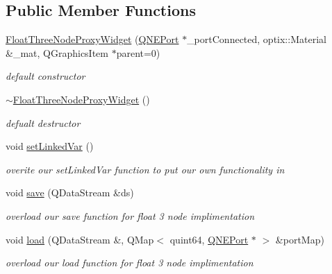 \subsection*{Public Member Functions}
\begin{DoxyCompactItemize}
\item 
\hyperlink{class_float_three_node_proxy_widget_ac212c5dca46905943b440d47aef9816e}{Float\-Three\-Node\-Proxy\-Widget} (\hyperlink{class_q_n_e_port}{Q\-N\-E\-Port} $\ast$\-\_\-port\-Connected, optix\-::\-Material \&\-\_\-mat, Q\-Graphics\-Item $\ast$parent=0)
\begin{DoxyCompactList}\small\item\em default constructor \end{DoxyCompactList}\item 
\hypertarget{class_float_three_node_proxy_widget_ad56cb8416bf4207dedd542cf5a359d63}{\hyperlink{class_float_three_node_proxy_widget_ad56cb8416bf4207dedd542cf5a359d63}{$\sim$\-Float\-Three\-Node\-Proxy\-Widget} ()}\label{class_float_three_node_proxy_widget_ad56cb8416bf4207dedd542cf5a359d63}

\begin{DoxyCompactList}\small\item\em defualt destructor \end{DoxyCompactList}\item 
\hypertarget{class_float_three_node_proxy_widget_a646dc00d5bf72c2555e0251b58a8b640}{void \hyperlink{class_float_three_node_proxy_widget_a646dc00d5bf72c2555e0251b58a8b640}{set\-Linked\-Var} ()}\label{class_float_three_node_proxy_widget_a646dc00d5bf72c2555e0251b58a8b640}

\begin{DoxyCompactList}\small\item\em overite our set\-Linked\-Var function to put our own functionality in \end{DoxyCompactList}\item 
\hypertarget{class_float_three_node_proxy_widget_afd953a0e2e5ac6f59b7b5c50ecbc7fa9}{void \hyperlink{class_float_three_node_proxy_widget_afd953a0e2e5ac6f59b7b5c50ecbc7fa9}{save} (Q\-Data\-Stream \&ds)}\label{class_float_three_node_proxy_widget_afd953a0e2e5ac6f59b7b5c50ecbc7fa9}

\begin{DoxyCompactList}\small\item\em overload our save function for float 3 node implimentation \end{DoxyCompactList}\item 
\hypertarget{class_float_three_node_proxy_widget_acbbe2ad712df333c00ee33f26b12fc61}{void \hyperlink{class_float_three_node_proxy_widget_acbbe2ad712df333c00ee33f26b12fc61}{load} (Q\-Data\-Stream \&, Q\-Map$<$ quint64, \hyperlink{class_q_n_e_port}{Q\-N\-E\-Port} $\ast$ $>$ \&port\-Map)}\label{class_float_three_node_proxy_widget_acbbe2ad712df333c00ee33f26b12fc61}

\begin{DoxyCompactList}\small\item\em overload our load function for float 3 node implimentation \end{DoxyCompactList}\end{DoxyCompactItemize}
